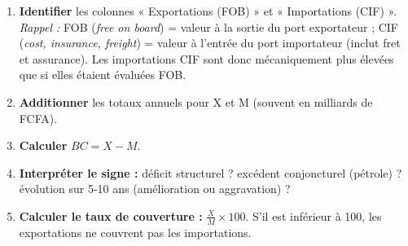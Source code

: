 \documentclass[11pt]{article}
\begin{document}
\begin{methode}
\begin{enumerate}
    \item \textbf{Identifier} les colonnes « Exportations (FOB) » et « Importations (CIF) ». \emph{Rappel :} FOB (\emph{free on board}) = valeur à la sortie du port exportateur ; CIF (\emph{cost, insurance, freight}) = valeur à l'entrée du port importateur (inclut fret et assurance). Les importations CIF sont donc mécaniquement plus élevées que si elles étaient évaluées FOB.
    \item \textbf{Additionner} les totaux annuels pour X et M (souvent en milliards de FCFA).
    \item \textbf{Calculer} $BC = X - M$.
    \item \textbf{Interpréter le signe :} déficit structurel ? excédent conjoncturel (pétrole) ? évolution sur 5-10 ans (amélioration ou aggravation) ?
    \item \textbf{Calculer le taux de couverture :} $\frac{X}{M} \times 100$. S'il est inférieur à 100, les exportations ne couvrent pas les importations.
\end{enumerate}
\end{methode}
\end{document}
